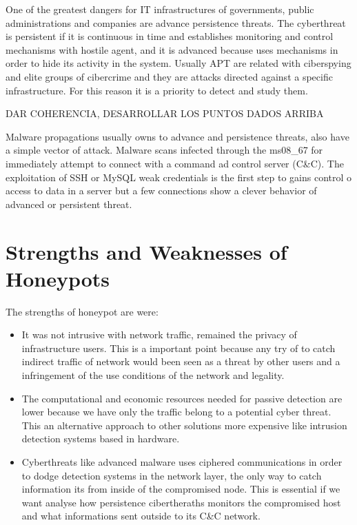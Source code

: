 \documentclass[a4paper]{llncs}
\begin{document}
One of the greatest dangers for IT infrastructures of governments, public administrations and companies are advance persistence threats. The cyberthreat is persistent if it is continuous in time and establishes monitoring and control mechanisms with hostile agent, and it is advanced because uses mechanisms in order to hide its activity in the system. Usually APT are related with ciberspying and elite groups of cibercrime and they are attacks directed against a specific infrastructure. For this reason it is a priority to detect and study them.

DAR COHERENCIA, DESARROLLAR LOS PUNTOS DADOS ARRIBA

Malware propagations usually owns to advance and persistence threats, also have a simple vector of attack. Malware scans infected through the ms08\_67 for immediately attempt to connect with a command ad control server (C\&C). The exploitation of SSH or MySQL weak credentials is the first step to gains control o access to data in a server but a few connections show a clever behavior of advanced or persistent threat.


\section{Strengths and Weaknesses of Honeypots}
The strengths of honeypot are were:
\begin{itemize}
\item It was not intrusive with network traffic, remained the privacy of infrastructure users. This is a important point because any try of to catch indirect traffic of network would been seen as a threat by other users and a infringement of the use conditions of the network and legality.
\item The computational and economic resources needed for passive detection are lower because we have only the traffic belong to a potential cyber threat. This an alternative approach to other solutions more expensive like intrusion detection systems based in hardware.
\item Cyberthreats like advanced malware uses ciphered communications in order to dodge detection systems in the network layer, the only way to catch information its from inside of the compromised node. This is essential if we want analyse how persistence cibertheraths monitors the compromised host and what informations sent outside to its C\&C network.
\end{itemize}
\end{document}
